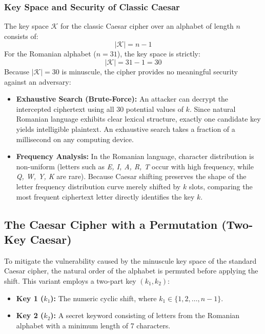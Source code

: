 \documentclass[12pt,a4paper]{article}
\begin{document}
\subsubsection{Key Space and Security of Classic Caesar}
The key space $\mathcal{K}$ for the classic Caesar cipher over an alphabet of length $n$ consists of:
\begin{equation}
    |\mathcal{K}| = n - 1
\end{equation}
For the Romanian alphabet ($n = 31$), the key space is strictly:
\begin{equation}
    |\mathcal{K}| = 31 - 1 = 30
\end{equation}
Because $|\mathcal{K}| = 30$ is minuscule, the cipher provides no meaningful security against an adversary:
\begin{itemize}
    \item \textbf{Exhaustive Search (Brute-Force):} An attacker can decrypt the intercepted ciphertext using all 30 potential values of $k$. Since natural Romanian language exhibits clear lexical structure, exactly one candidate key yields intelligible plaintext. An exhaustive search takes a fraction of a millisecond on any computing device.
    \item \textbf{Frequency Analysis:} In the Romanian language, character distribution is non-uniform (letters such as \textit{E, I, A, R, T} occur with high frequency, while \textit{Q, W, Y, K} are rare). Because Caesar shifting preserves the shape of the letter frequency distribution curve merely shifted by $k$ slots, comparing the most frequent ciphertext letter directly identifies the key $k$.
\end{itemize}

\subsection{The Caesar Cipher with a Permutation (Two-Key Caesar)}
To mitigate the vulnerability caused by the minuscule key space of the standard Caesar cipher, the natural order of the alphabet is permuted before applying the shift. This variant employs a two-part key $(k_1, k_2)$:
\begin{itemize}
    \item \textbf{Key 1 ($k_1$):} The numeric cyclic shift, where $k_1 \in \{1, 2, \dots, n-1\}$.
    \item \textbf{Key 2 ($k_2$):} A secret keyword consisting of letters from the Romanian alphabet with a minimum length of 7 characters.
\end{itemize}
\end{document}
